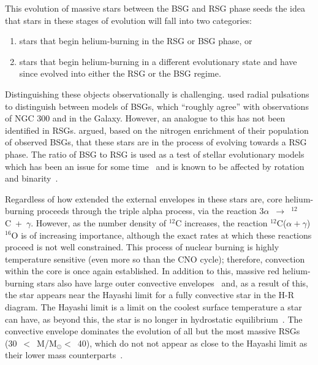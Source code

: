 This evolution of massive stars between the BSG and RSG phase seeds the idea that stars in these stages of evolution will fall into two categories:

\begin{enumerate}
    \item stars that begin helium-burning in the RSG or BSG phase, or
    \item stars that begin helium-burning in a different evolutionary state and have since evolved into either the RSG or the BSG regime.
\end{enumerate}

Distinguishing these objects observationally is challenging.
\cite{Saio13} used radial pulsations to distinguish between models of BSGs, which ``roughly agree'' with observations of NGC 300 and in the Galaxy.
However, an analogue to this has not been identified in RSGs.
\cite{2012A&A...542A..79C} argued, based on the nitrogen enrichment of their population of observed BSGs, that these stars are in the process of evolving towards a RSG phase.
The ratio of BSG to RSG is used as a test of stellar evolutionary models which has been an issue for some time~\citep{1995A&A...295..685L} and is known to be affected by rotation~\citep{2001A&A...373..555M,2012A&A...537A.146E} and binarity~\citep{2008MNRAS.384.1109E}.


Regardless of how extended the external envelopes in these stars are, core helium-burning proceeds through the triple alpha process, via the reaction 3$\alpha$~$\rightarrow$~$^{12}$C~+~$\gamma$.
However, as the number density of $^{12}$C increases, the reaction $^{12}$C($\alpha+\gamma$)$^{16}$O is of increasing importance, although the exact rates at which these reactions proceed is not well constrained.
This process of nuclear burning is highly temperature sensitive (even more so than the CNO cycle); therefore, convection within the core is once again established.
In addition to this, massive red helium-burning stars also have large outer convective envelopes~\citep{2012sse..book.....K} and, as a result of this, the star appears near the Hayashi limit for a fully convective star in the H-R diagram.
The Hayashi limit is a limit on the coolest surface temperature a star can have, as beyond this, the star is no longer in hydrostatic equilibrium~\citep{1961PASJ...13..442H}.
The convective envelope dominates the evolution of all but the most massive RSGs (30~$<$~M/M$_{\odot}<$~40), which do not not appear as close to the Hayashi limit as their lower mass counterparts~\citep[see Figure~1 in][]{Saio13}.

